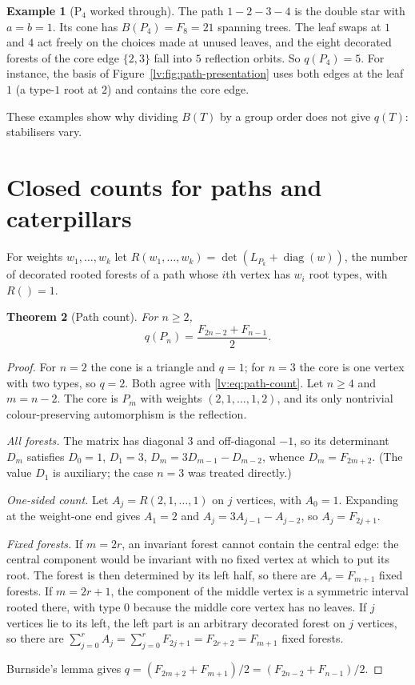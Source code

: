 \documentclass[11pt,a4paper]{article}
\newtheorem{theorem}{Theorem}[section]
\theoremstyle{definition}
\newtheorem{example}[theorem]{Example}
\theoremstyle{remark}
\begin{document}
\begin{example}[P$_4$ worked through]
The path $1-2-3-4$ is the double star with $a=b=1$. Its cone has $B(P_4)=F_8=21$ spanning trees. The leaf swaps at $1$ and $4$ act freely on the choices made at unused leaves, and the eight decorated forests of the core edge $\{2,3\}$ fall into $5$ reflection orbits. So $q(P_4)=5$. For instance, the basis of Figure~\ref{lv:fig:path-presentation} uses both edges at the leaf $1$ (a type-$1$ root at $2$) and contains the core edge.
\end{example}

These examples show why dividing $B(T)$ by a group order does not give $q(T)$: stabilisers vary.

\section{Closed counts for paths and caterpillars}
\label{lv:sec:paths}

For weights $w_1,\dots,w_k$ let $R(w_1,\dots,w_k)=\det(L_{P_k}+\operatorname{diag}(w))$, the number of decorated rooted forests of a path whose $i$th vertex has $w_i$ root types, with $R()=1$.

\begin{theorem}[Path count]
\label{lv:thm:path-count}
For $n\geq2$,
\begin{equation}
 q(P_n)=\frac{F_{2n-2}+F_{n-1}}{2}.
 \label{lv:eq:path-count}
\end{equation}
\end{theorem}

\begin{proof}
For $n=2$ the cone is a triangle and $q=1$; for $n=3$ the core is one vertex with two types, so $q=2$. Both agree with \eqref{lv:eq:path-count}. Let $n\geq4$ and $m=n-2$. The core is $P_m$ with weights $(2,1,\dots,1,2)$, and its only nontrivial colour-preserving automorphism is the reflection.

\emph{All forests.} The matrix has diagonal $3$ and off-diagonal $-1$, so its determinant $D_m$ satisfies $D_0=1$, $D_1=3$, $D_m=3D_{m-1}-D_{m-2}$, whence $D_m=F_{2m+2}$. (The value $D_1$ is auxiliary; the case $n=3$ was treated directly.)

\emph{One-sided count.} Let $A_j=R(2,1,\dots,1)$ on $j$ vertices, with $A_0=1$. Expanding at the weight-one end gives $A_1=2$ and $A_j=3A_{j-1}-A_{j-2}$, so $A_j=F_{2j+1}$.

\emph{Fixed forests.} If $m=2r$, an invariant forest cannot contain the central edge: the central component would be invariant with no fixed vertex at which to put its root. The forest is then determined by its left half, so there are $A_r=F_{m+1}$ fixed forests. If $m=2r+1$, the component of the middle vertex is a symmetric interval rooted there, with type $0$ because the middle core vertex has no leaves. If $j$ vertices lie to its left, the left part is an arbitrary decorated forest on $j$ vertices, so there are $\sum_{j=0}^rA_j=\sum_{j=0}^rF_{2j+1}=F_{2r+2}=F_{m+1}$ fixed forests.

Burnside's lemma gives $q=(F_{2m+2}+F_{m+1})/2=(F_{2n-2}+F_{n-1})/2$.
\end{proof}
\end{document}
